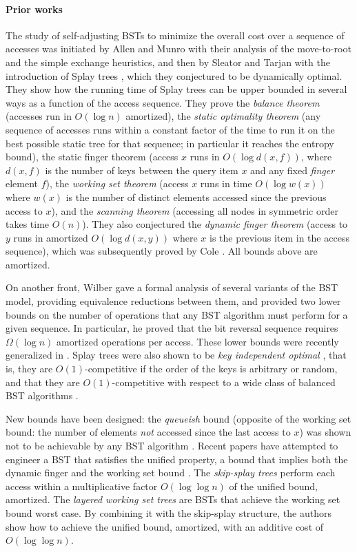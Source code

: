 \documentclass[11pt]{article}
\begin{document}
\paragraph{Prior works}
The study of self-adjusting BSTs to minimize the overall cost over a
sequence of accesses was initiated by Allen and Munro \cite{allen}
with their analysis of the move-to-root and the simple exchange
heuristics, and then by Sleator and Tarjan with the introduction of
Splay trees \cite{splay}, which they conjectured to be dynamically
optimal.  They show how the running time of Splay trees can be upper
bounded in several ways as a function of the access sequence. They
prove the \emph{balance theorem} (accesses run in $O(\log n)$
amortized), the \emph{static optimality theorem} (any sequence of
accesses runs within a constant factor of the time to run it on the
best possible static tree for that sequence; in particular it reaches
the entropy bound), the static finger theorem (access $x$ runs
in $O(\log d(x,f))$, where $d(x,f)$ is the number of keys between the
query item $x$ and any fixed \emph{finger} element $f$), the
\emph{working set theorem} (access $x$ runs in time $O(\log w(x))$
where $w(x)$ is the number of distinct elements accessed since the
previous access to $x$), and the \emph{scanning theorem} (accessing
all nodes in symmetric order takes time $O(n)$). They also conjectured
the \emph{dynamic finger theorem} (access to $y$ runs in amortized
$O(\log d(x,y))$ where $x$ is the previous item in the access
sequence), which was subsequently proved by Cole \cite{cole,cole2}.
All bounds above are amortized.

On another front, Wilber \cite{wilber89} gave a formal analysis of
several variants of the BST model, providing equivalence reductions
between them, and provided two lower bounds on the number of
operations that any BST algorithm must perform for a given sequence.
In particular, he proved that the bit reversal sequence requires
$\Omega(\log n)$ amortized operations per access. 
These lower bounds were recently generalized
in \cite{rectcover,BST_SODA2009}. 
Splay trees were also shown to be \emph{key independent optimal}
\cite{keyindependent}, that is, they are $O(1)$-competitive if the order of the
keys is arbitrary or random, and that they are $O(1)$-competitive with
respect to a wide class of balanced BST algorithms \cite{Georgakopoulos200464}.

New bounds have been designed: the \emph{queueish} bound (opposite of the
working set bound: the number of elements \emph{not} accessed since
the last access to $x$) was shown not to be achievable by any BST algorithm
\cite{queaps}. Recent papers have attempted to engineer a BST that satisfies the
unified property, a bound that implies both the dynamic finger and the working set
bound \cite{unified,unified2}. The \emph{skip-splay trees} \cite{skipsplay}
perform each access within a multiplicative factor $O(\log \log n)$ of
the unified bound, amortized. The \emph{layered working set trees} \cite{workingsettrees}
are BSTs that achieve the working set bound worst case. By combining
it with the skip-splay structure, the authors show how to achieve the
unified bound, amortized, with an additive cost of $O(\log \log n)$. 
\end{document}
